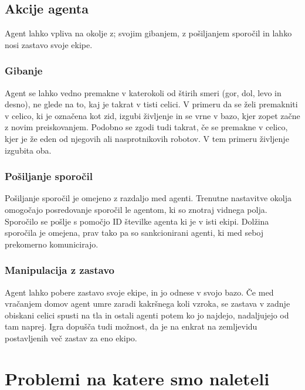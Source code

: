 \documentclass[12pt,a4paper,openany]{book}
\begin{document}
\section{Akcije agenta}
Agent lahko vpliva na okolje z; svojim gibanjem, z pošiljanjem sporočil in lahko nosi zastavo svoje ekipe.

\subsection{Gibanje}
Agent se lahko vedno premakne v katerokoli od štirih smeri (gor, dol, levo in desno), ne glede na to,
kaj je takrat v tisti celici. V primeru da se želi premakniti v celico, ki je označena kot zid, izgubi
življenje in se vrne v bazo, kjer zopet začne z novim preiskovanjem. Podobno se zgodi tudi takrat, če
se premakne v celico, kjer je že eden od njegovih ali nasprotnikovih robotov. V tem primeru življenje izgubita oba.

\subsection{Pošiljanje sporočil}
Pošiljanje sporočil je omejeno z razdaljo med agenti. Trenutne nastavitve okolja omogočajo posredovanje sporočil
 le agentom, ki so znotraj vidnega polja. Sporočilo se pošlje s pomočjo ID številke agenta ki je v isti ekipi.
 Dolžina sporočila je omejena, prav tako pa so sankcionirani agenti, ki med seboj prekomerno komunicirajo.

\subsection{Manipulacija z zastavo}
Agent lahko pobere zastavo svoje ekipe, in jo odnese v svojo bazo. Če med vračanjem domov agent umre zaradi
kakršnega koli vzroka, se zastava v zadnje obiskani celici spusti na tla in ostali agenti potem ko jo najdejo,
nadaljujejo od tam naprej. Igra dopušča tudi možnost, da je na enkrat na zemljevidu postavljenih več zastav za eno ekipo.



\chapter{Problemi na katere smo naleteli}
\end{document}
